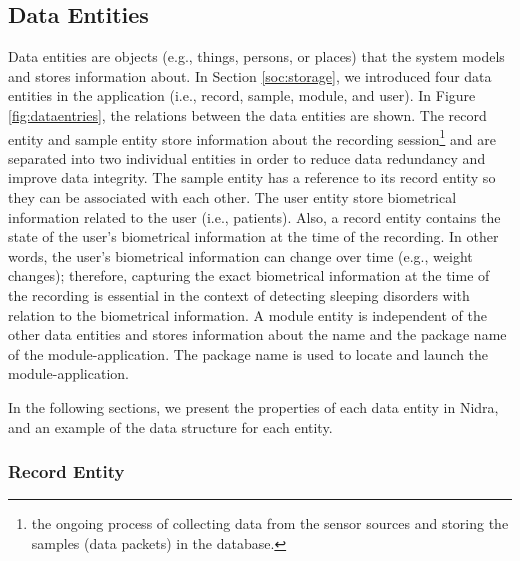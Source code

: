 \subsection{Data Entities}\label{des:dataentity}
Data entities are objects (e.g., things, persons, or places) that the system models and stores information about. In Section \ref{soc:storage}, we introduced four data entities in the application (i.e., record, sample, module, and user). In Figure \ref{fig:dataentries}, the relations between the data entities are shown. The record entity and sample entity store information about the recording session\footnote{the ongoing process of collecting data from the sensor sources and storing the samples (data packets) in the database.} and are separated into two individual entities in order to reduce data redundancy and improve data integrity. The sample entity has a reference to its record entity so they can be associated with each other. The user entity store biometrical information related to the user (i.e., patients). Also, a record entity contains the state of the user's biometrical information at the time of the recording. In other words, the user's biometrical information can change over time (e.g.,  weight changes); therefore, capturing the exact biometrical information at the time of the recording is essential in the context of detecting sleeping disorders with relation to the biometrical information.  A module entity is independent of the other data entities and stores information about the name and the package name of the module-application. The package name is used to locate and launch the module-application. 

In the following sections, we present the properties of each data entity in Nidra, and an example of the data structure for each entity.  


\subsubsection{Record Entity} \label{ssec:record}

